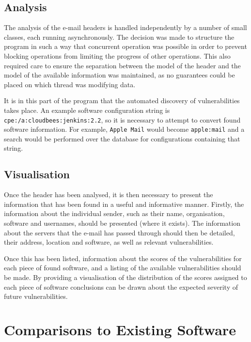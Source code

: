 \subsection{Analysis}

The analysis of the e-mail headers is handled independently by a number of
small classes, each running asynchronously.  The decision was made to structure
the program in such a way that concurrent operation was possible in order to
prevent blocking operations from limiting the progress of other operations.
This also required care to ensure the separation between the model of the
header and the model of the available information was maintained, as no
guarantees could be placed on which thread was modifying data.

It is in this part of the program that the automated discovery of
vulnerabilities takes place.  An example software configuration string is
\texttt{cpe:/a:cloudbees:jenkins:2.2}, so it is necessary to attempt to convert
found software information.  For example, \texttt{Apple Mail} would become
\texttt{apple:mail} and a search would be performed over the database for
configurations containing that string.


\subsection{Visualisation}

Once the header has been analysed, it is then necessary to present the
information that has been found in a useful and informative manner. Firstly,
the information about the individual sender, such as their name, organisation,
software and usernames, should be presented (where it exists).  The information
about the servers that the e-mail has passed through should then be detailed, 
their address, location and software, as well as relevant vulnerabilities.

Once this has been listed, information about the scores of the vulnerabilities
for each piece of found software, and a listing of the available
vulnerabilities should be made.  By providing a visualisation of the
distribution of the scores assigned to each piece of software conclusions can 
be drawn about the expected severity of future vulnerabilities.

\section{Comparisons to Existing Software}

